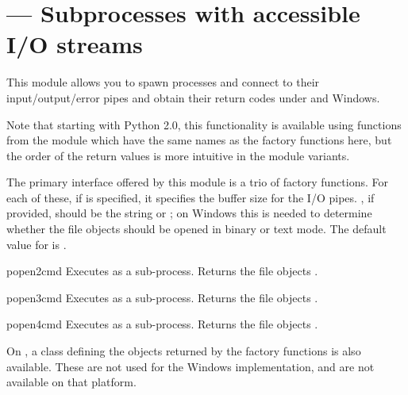\section{ ---
         Subprocesses with accessible I/O streams}



This module allows you to spawn processes and connect to their
input/output/error pipes and obtain their return codes under
\UNIX{} and Windows.

Note that starting with Python 2.0, this functionality is available
using functions from the  module which have the same
names as the factory functions here, but the order of the return
values is more intuitive in the  module variants.

The primary interface offered by this module is a trio of factory
functions.  For each of these, if  is specified, 
it specifies the buffer size for the I/O pipes.  , if
provided, should be the string  or ; on Windows
this is needed to determine whether the file objects should be opened
in binary or text mode.  The default value for  is
.

\begin{funcdesc}{popen2}{cmd}
Executes  as a sub-process.  Returns the file objects
.
\end{funcdesc}

\begin{funcdesc}{popen3}{cmd}
Executes  as a sub-process.  Returns the file objects
.
\end{funcdesc}

\begin{funcdesc}{popen4}{cmd}
Executes  as a sub-process.  Returns the file objects
.
\end{funcdesc}


On \UNIX, a class defining the objects returned by the factory
functions is also available.  These are not used for the Windows
implementation, and are not available on that platform.

